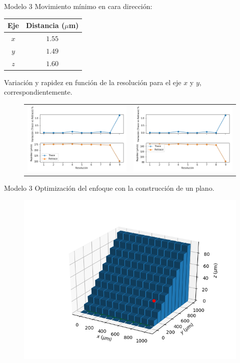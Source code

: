 \documentclass{beamer}
\begin{document}
    \begin{frame}{Modelo 3}
    	Movimiento mínimo en cara dirección:
   		\begin{table}[h]
   			\centering
   			\tiny
   			\begin{tabular}{cc}
   				\hline
   				\textbf{Eje} & \textbf{Distancia ($\mu$m)} \\
   				\hline
   				$x$ & $1.55$ \\
   				$y$ & $1.49$ \\
   				$z$ & $1.60$ \\
   				\hline		
   			\end{tabular}
   		\end{table}
    	
    	Variación y rapidez en función de la resolución para el eje $x$ y $y$, correspondientemente.
    	\begin{figure}[h]
    		\centering
    		\begin{tabular}{cc}
    			\includegraphics[width=0.45\linewidth]{figures/x.png} & 
    			\includegraphics[width=0.45\linewidth]{figures/y.png}
    		\end{tabular}
    	\end{figure}  	
    \end{frame}
    \begin{frame}{Modelo 3}
    	Optimización del enfoque con la construcción de un plano.
    	\begin{figure}[h]
    		\centering
    		\includegraphics[width=0.7\linewidth]{figures/plane.png}
    	\end{figure}
    \end{frame}
    
\end{document}
